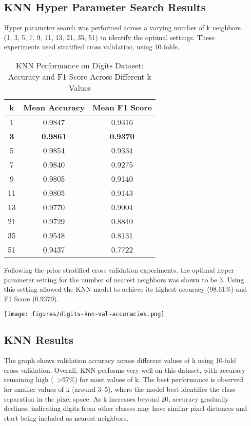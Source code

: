 \documentclass[letterpaper]{article}
\begin{document}
\subsection{KNN Hyper Parameter Search Results}

    Hyper parameter search was performed across a varying number of k neighbors (1, 3, 5, 7, 9, 11, 13, 21, 35, 51) to identify the optimal settings. These experiments used stratified cross validation, using 10 folds.

\begin{table}[h]
\centering
\begin{tabular}{|c|c|c|}
\hline
\textbf{k} & \textbf{Mean Accuracy} & \textbf{Mean F1 Score} \\
\hline
1  & 0.9847 & 0.9316 \\
\textbf{3}  & \textbf{0.9861} & \textbf{0.9370} \\
5  & 0.9854 & 0.9334 \\
7  & 0.9840 & 0.9275 \\
9  & 0.9805 & 0.9140 \\
11 & 0.9805 & 0.9143 \\
13 & 0.9770 & 0.9004 \\
21 & 0.9729 & 0.8840 \\
35 & 0.9548 & 0.8131 \\
51 & 0.9437 & 0.7722 \\
\hline
\end{tabular}
\caption{KNN Performance on Digits Dataset: Accuracy and F1 Score Across Different k Values}
\label{tab:knn_results}
\end{table}

Following the prior stratified cross validation experiments, the optimal hyper parameter setting for the number of nearest neighbors was shown to be 3. Using this setting allowed the KNN model to achieve its highest accuracy (98.61\%) and F1 Score (0.9370).

 \vspace{0.2in}
        \begin{minipage}{\linewidth}
            \centering
            \texttt{[image: figures/digits-knn-val-accuracies.png]}
        \end{minipage}
\vspace{0.1in}

\subsection*{KNN Results}
The graph shows validation accuracy across different values of k using 10-fold cross-validation. Overall, KNN performs very well on this dataset, with accuracy remaining high (~>97\%) for most values of k. The best performance is observed for smaller values of k (around 3–5), where the model best identifies the class separation in the pixel space. As k increases beyond 20, accuracy gradually declines, indicating digits from other classes may have similar pixel distances and start being included as nearest neighbors.
\end{document}
